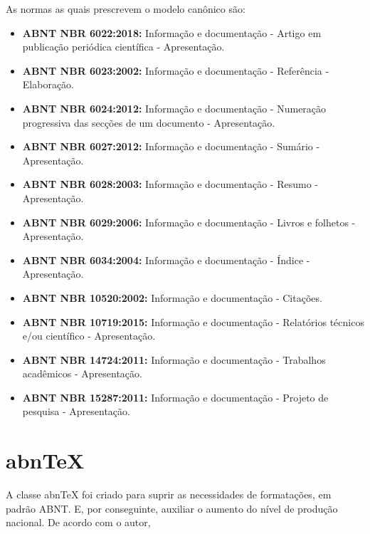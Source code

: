 \documentclass[
12pt,				%
openright,			%
oneside,			%
a4paper,			%
english,			%
french,				%
spanish,			%
brazil,				%
]{abntex2}
\begin{document}
\clearpage

As normas as quais prescrevem o modelo canônico são:

\begin{itemize}
\item \textbf{ABNT NBR 6022:2018:} Informação e documentação -
  Artigo em publicação periódica científica - Apresentação.
\item \textbf{ABNT NBR 6023:2002:} Informação e documentação -
  Referência - Elaboração.
\item \textbf{ABNT NBR 6024:2012:} Informação e documentação -
  Numeração progressiva das secções de um documento - Apresentação.
\item \textbf{ABNT NBR 6027:2012:} Informação e documentação -
  Sumário - Apresentação.
\item \textbf{ABNT NBR 6028:2003:} Informação e documentação -
  Resumo - Apresentação.
\item \textbf{ABNT NBR 6029:2006:} Informação e documentação -
  Livros e folhetos - Apresentação.
\item \textbf{ABNT NBR 6034:2004:} Informação e documentação -
  Índice - Apresentação.
\item \textbf{ABNT NBR 10520:2002:} Informação e documentação -
  Citações.
\item \textbf{ABNT NBR 10719:2015:} Informação e documentação -
  Relatórios técnicos e/ou científico - Apresentação.
\item \textbf{ABNT NBR 14724:2011:} Informação e documentação -
  Trabalhos acadêmicos - Apresentação.
\item \textbf{ABNT NBR 15287:2011:} Informação e documentação -
  Projeto de pesquisa - Apresentação.
\end{itemize}

\section{abnTeX}

A classe abnTeX foi criado para suprir as necessidades de
formatações, em padrão ABNT. E, por conseguinte, auxiliar o aumento
do nível de produção nacional. De acordo com o autor,
\end{document}
